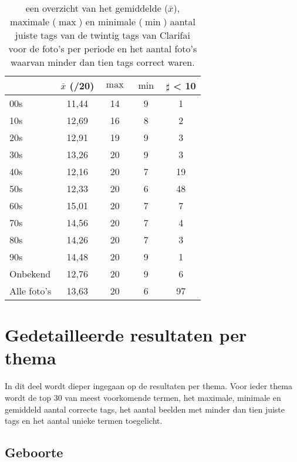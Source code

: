 \begin{table}
	\begin{tabular}{p{3cm}|cccc}
		\toprule
		& $\bar{x}$ (/20) & $\max$ & $\min$ &  $\sharp$ < 10 \\ 
		\midrule
		00s & 11,44 & 14 & 9 & 1 \\ 
		10s & 12,69 & 16 & 8 &  2 \\ 
		20s & 12,91 & 19 & 9 & 3 \\ 
		30s & 13,26 & 20 & 9  & 3 \\ 
		40s & 12,16 & 20 & 7  & 19 \\ 
		50s & 12,33 & 20 & 6  & 48 \\ 
		60s & 15,01 & 20 & 7  & 7 \\ 
		70s & 14,56 & 20 & 7  & 4 \\ 
		80s & 14,26 & 20 & 7  & 3 \\ 
		90s & 14,48 & 20 & 9  & 1 \\ 
		Onbekend & 12,76 & 20 & 9  & 6 \\ 
		Alle foto's & 13,63 & 20 & 6  & 97 \\ 
		\bottomrule
	\end{tabular} 
	\caption[een overzicht van de resultaten per periode na gebruikt van het ingebouwde model van Clarifai]{een overzicht van het gemiddelde ($\bar{x}$), maximale ($\max$) en minimale ($\min$) aantal juiste tags van de twintig tags van Clarifai voor de foto’s per periode en het aantal foto’s waarvan minder dan tien tags correct waren. }
	\label{tab:analyse-resultaten-periode}
\end{table}

\section{Gedetailleerde resultaten per thema}
\label{sec:gedetailleerde-resultaten-per-thema}

In dit deel wordt dieper ingegaan op de resultaten per thema. Voor ieder thema wordt de top 30 van meest voorkomende termen, het maximale, minimale en gemiddeld aantal correcte tags, het aantal beelden met minder dan tien juiste tags en het aantal unieke termen toegelicht. 

\subsection{Geboorte}

